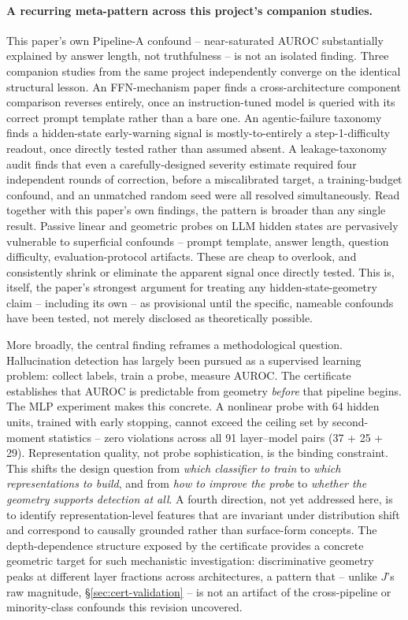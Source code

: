 \documentclass[10pt,twocolumn]{article}
\begin{document}
\paragraph{A recurring meta-pattern across this project's companion
studies.} This paper's own Pipeline-A confound -- near-saturated AUROC
substantially explained by answer length, not truthfulness -- is not
an isolated finding. Three companion studies from the same project
independently converge on the identical structural lesson. An
FFN-mechanism paper finds a cross-architecture component comparison
reverses entirely, once an instruction-tuned model is queried with its
correct prompt template rather than a bare one. An agentic-failure
taxonomy finds a hidden-state early-warning signal is
mostly-to-entirely a step-1-difficulty readout, once directly tested
rather than assumed absent. A leakage-taxonomy audit finds that even a
carefully-designed severity estimate required four independent rounds
of correction, before a miscalibrated target, a training-budget
confound, and an unmatched random seed were all resolved
simultaneously. Read together with this paper's own findings, the
pattern is broader than any single result. Passive linear and
geometric probes on LLM hidden states are pervasively vulnerable to
superficial confounds -- prompt template, answer length, question
difficulty, evaluation-protocol artifacts. These are cheap to overlook,
and consistently shrink or eliminate the apparent signal once directly
tested. This is, itself, the paper's strongest argument for treating
any hidden-state-geometry claim -- including its own -- as provisional
until the specific, nameable confounds have been tested, not merely
disclosed as theoretically possible.

More broadly, the central finding reframes a methodological question.
Hallucination detection has largely been pursued as a supervised
learning problem: collect labels, train a probe, measure AUROC. The
certificate establishes that AUROC is predictable from geometry
\emph{before} that pipeline begins. The MLP experiment makes this
concrete. A nonlinear probe with 64 hidden units, trained with early
stopping, cannot exceed the ceiling set by second-moment statistics --
zero violations across all 91 layer--model pairs (37 + 25 + 29).
Representation quality, not probe sophistication, is the binding
constraint. This shifts the design question from \emph{which
classifier to train} to \emph{which representations to build}, and
from \emph{how to improve the probe} to \emph{whether the geometry
supports detection at all}. A fourth direction, not yet addressed
here, is to identify representation-level features that are invariant
under distribution shift and correspond to causally grounded rather
than surface-form concepts. The depth-dependence structure exposed by
the certificate provides a concrete geometric target for such
mechanistic investigation: discriminative geometry peaks at different
layer fractions across architectures, a pattern that -- unlike $J$'s
raw magnitude, \S\ref{sec:cert-validation} -- is not an artifact of the
cross-pipeline or minority-class confounds this revision uncovered.
\end{document}
